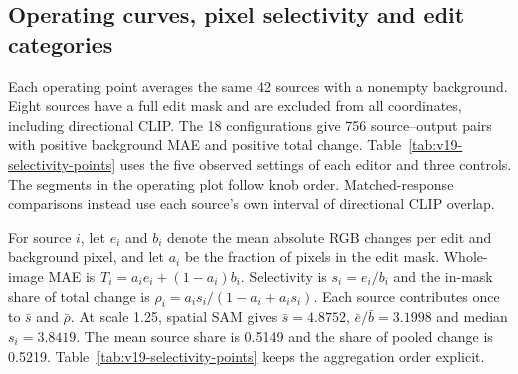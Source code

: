\subsection{Operating curves, pixel selectivity and edit categories}
\label{sec:v19-selectivity}
Each operating point averages the same 42 sources with a nonempty background.
Eight sources have a full edit mask and are excluded from all coordinates,
including directional CLIP. The 18 configurations give 756 source--output
pairs with positive background MAE and positive total change. Table~\ref{tab:v19-selectivity-points}
uses the five observed settings of each editor and three controls. The segments
in the operating plot follow knob order. Matched-response comparisons instead
use each source's own interval of directional CLIP overlap.

For source $i$, let $e_i$ and $b_i$ denote the mean absolute RGB changes per
edit and background pixel, and let $a_i$ be the fraction of pixels in the edit
mask. Whole-image MAE is $T_i=a_i e_i+(1-a_i)b_i$. Selectivity is
$s_i=e_i/b_i$ and the in-mask share of total change is
$\rho_i=a_i s_i/(1-a_i+a_i s_i)$. Each source contributes once to
$\bar s$ and $\bar\rho$. At scale 1.25, spatial SAM gives
$\bar s=4.8752$, $\bar e/\bar b=3.1998$ and median $s_i=3.8419$.
The mean source share is 0.5149 and the share of pooled change is 0.5219.
Table~\ref{tab:v19-selectivity-points} keeps the aggregation order explicit.

